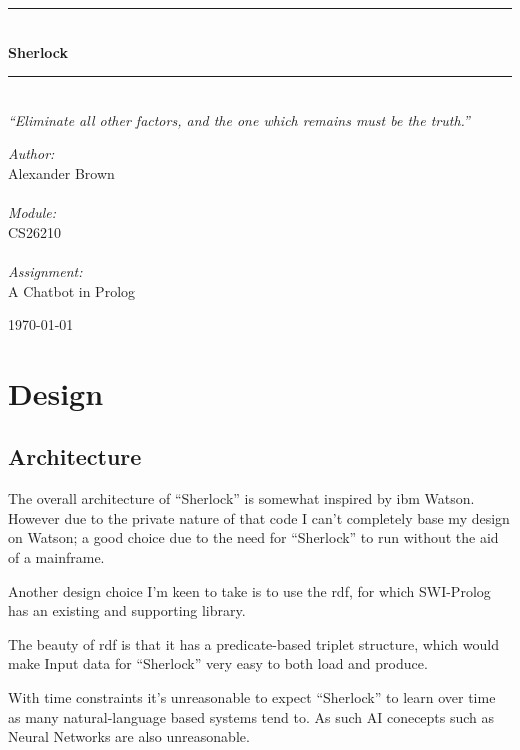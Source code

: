 \documentclass[11pt,a4paper]{report}
\newcommand{\HRule}{\rule{\linewidth}{0.5mm}}
\begin{document}
\begin{titlepage}
\begin{center}
\HRule \\[0.4cm]
{ \huge \bfseries Sherlock}\\[0.0cm]
\HRule \\[0.0cm]
{ \large \emph{``Eliminate all other factors, and the one which remains must be the truth.''}}\\[2.0cm]
\begin{minipage}{0.4\textwidth}
\begin{flushleft} \large
\emph{Author:}\\
Alexander Brown\\
\ \\
\emph{Module:}\\
CS26210\\
\ \\
\emph{Assignment:}\\
A Chatbot in Prolog
\end{flushleft}
\end{minipage}
\begin{minipage}{0.4\textwidth}
\begin{flushright} \large
\end{flushright}
\end{minipage}
\vfill
{\large \today}
\end{center}
\end{titlepage}

\tableofcontents
\chapter{Design}
\section{Architecture}
The overall architecture of ``Sherlock'' is somewhat inspired by \gls{ibm} Watson. 
However due to the private nature of that code I can't completely base my 
design on Watson; a good choice due to the need for ``Sherlock'' to run 
without the aid of a mainframe.

Another design choice I'm keen to take is to use the \gls{rdf}, for which 
SWI-Prolog has an existing and supporting library.

The beauty of \gls{rdf} is that it has a predicate-based triplet structure, which
would make Input data for ``Sherlock'' very easy to both load and produce.

With time constraints it's unreasonable to expect ``Sherlock'' to learn over
time as many natural-language based systems tend to. As such AI conecepts
such as Neural Networks are also unreasonable.
\end{document}
